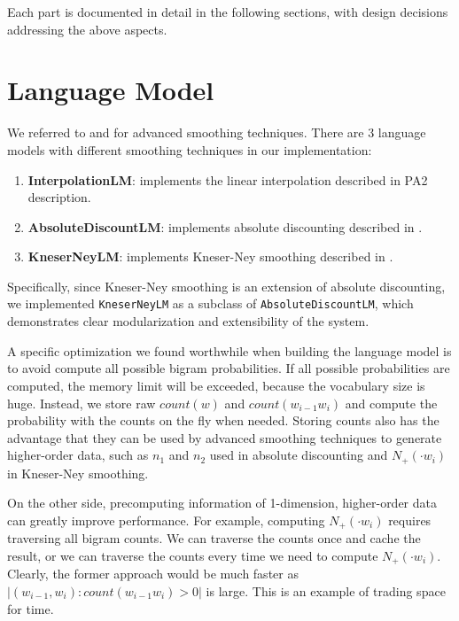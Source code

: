\documentclass{article}
\begin{document}
Each part is documented in detail in the following sections, with design decisions addressing the above aspects.

\section{Language Model}

We referred to \cite{cs124-lm} and \cite{chen-goodman-99} for advanced smoothing techniques. There are 3 language models with different smoothing techniques in our implementation:

\begin{enumerate}
    \item \textbf{InterpolationLM}: implements the linear interpolation described in PA2 description.
    \item \textbf{AbsoluteDiscountLM}: implements absolute discounting described in \cite{chen-goodman-99}.
    \item \textbf{KneserNeyLM}: implements Kneser-Ney smoothing described in \cite{chen-goodman-99}.
\end{enumerate}

Specifically, since Kneser-Ney smoothing is an extension of absolute discounting, we implemented \texttt{KneserNeyLM} as a subclass of \texttt{AbsoluteDiscountLM}, which demonstrates clear modularization and extensibility of the system.

A specific optimization we found worthwhile when building the language model is to avoid compute all possible bigram probabilities. If all possible probabilities are computed, the memory limit will be exceeded, because the vocabulary size is huge. Instead, we store raw $count(w)$ and $count(w_{i-1}w_i)$ and compute the probability with the counts on the fly when needed. Storing counts also has the advantage that they can be used by advanced smoothing techniques to generate higher-order data, such as $n_1$ and $n_2$ used in absolute discounting and $N_{+}({\cdot}w_i)$ in Kneser-Ney smoothing.

On the other side, precomputing information of 1-dimension, higher-order data can greatly improve performance. For example, computing $N_{+}({\cdot}w_i)$ requires traversing all bigram counts. We can traverse the counts once and cache the result, or we can traverse the counts every time we need to compute $N_{+}({\cdot}w_i)$. Clearly, the former approach would be much faster as $|(w_{i-1},w_i): count(w_{i-1}w_i)>0|$ is large. This is an example of trading space for time.
\end{document}
